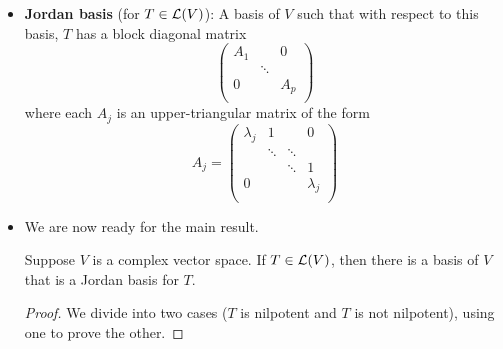\documentclass[../main.tex]{subfiles}
\begin{document}
\begin{itemize}
\begin{theorem}
\begin{proof}
\begin{equation*}
                N^{m_1+1}u_1,\dots,Nu_1,u_1,\dots,N^{m_n+1}u_n,\dots,Nu_n,u_n,u_{n+1},\dots,u_{n+p}
            \end{equation*}
            spans $V$ since its span contains each $x_j$ (in the span of the List \ref{eqn:8.2} part) and each $u_{n+j}$ and hence each $w_j$ (and because List \ref{eqn:8.3} spans $V$). Thus, since the above spanning list has the same length as the basis of $V$ in List \ref{eqn:8.3}, Theorem \ref{trm:sameDimSpanning} implies that it is a basis of $V$. It clearly has the required form (choose $m_j=0$ for $j=n+1,\dots,n+p$). Additionally, we have $Nu_{n+j}=Nw_j-Nx_j=0$ for each $j=1,\dots,n$, verifying part (b).
        \end{proof}
    \end{theorem}
    \item \textbf{Jordan basis} (for $T\in\mathcal{L}(V)$): A basis of $V$ such that with respect to this basis, $T$ has a block diagonal matrix
    \begin{equation*}
        \begin{pmatrix}
            A_1 &  & 0\\
             & \ddots & \\
            0 &  & A_p\\
        \end{pmatrix}
    \end{equation*}
    where each $A_j$ is an upper-triangular matrix of the form
    \begin{equation*}
        A_j =
        \begin{pmatrix}
            \lambda_j & 1 &  & 0\\
             & \ddots & \ddots & \\
             &  & \ddots & 1\\
            0 &  &  & \lambda_j\\
        \end{pmatrix}
    \end{equation*}
    \item We are now ready for the main result.
    \begin{theorem}
        Suppose $V$ is a complex vector space. If $T\in\mathcal{L}(V)$, then there is a basis of $V$ that is a Jordan basis for $T$.
        \begin{proof}
            We divide into two cases ($T$ is nilpotent and $T$ is not nilpotent), using one to prove the other.

\end{proof}
\end{theorem}
\end{itemize}
\end{document}
